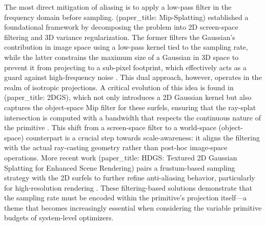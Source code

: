 \documentclass[11pt,a4paper]{article}
\begin{document}
The most direct mitigation of aliasing is to apply a low-pass filter in the frequency domain before sampling. \cite{arxiv:2311.16493v1}(paper\_title: Mip-Splatting) established a foundational framework by decomposing the problem into 2D screen-space filtering and 3D variance regularization. The former filters the Gaussian's contribution in image space using a low-pass kernel tied to the sampling rate, while the latter constrains the maximum size of a Gaussian in 3D space to prevent it from projecting to a sub-pixel footprint, which effectively acts as a guard against high-frequency noise \cite{arxiv:2311.16493v1,arxiv:2603.19682v2}. This dual approach, however, operates in the realm of isotropic projections. A critical evolution of this idea is found in \cite{arxiv:2506.02751v3} (paper\_title: 2DGS), which not only introduces a 2D Gaussian kernel but also captures the object-space Mip filter for these surfels, ensuring that the ray-splat intersection is computed with a bandwidth that respects the continuous nature of the primitive \cite{arxiv:2506.02751v3}. This shift from a screen-space filter to a world-space (object-space) counterpart is a crucial step towards scale-awareness: it aligns the filtering with the actual ray-casting geometry rather than post-hoc image-space operations. More recent work \cite{arxiv:2504.13204v2} (paper\_title: HDGS: Textured 2D Gaussian Splatting for Enhanced Scene Rendering) pairs a frustum-based sampling strategy with the 2D surfels to further refine anti-aliasing behavior, particularly for high-resolution rendering \cite{arxiv:2504.13204v2}. These filtering-based solutions demonstrate that the sampling rate must be encoded within the primitive's projection itself---a theme that becomes increasingly essential when considering the variable primitive budgets of system-level optimizers.
\end{document}

